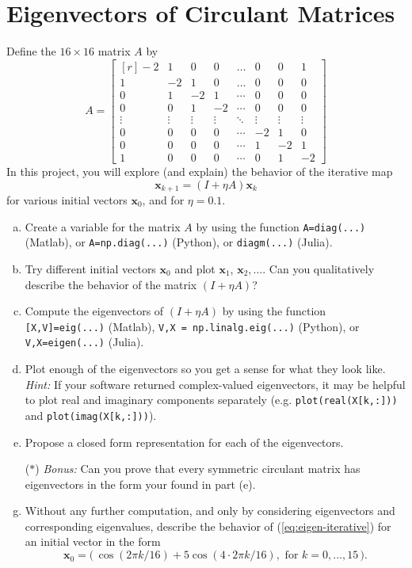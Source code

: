 \section{Eigenvectors of Circulant Matrices}


Define the $16 \times 16$ matrix $A$ by
\begin{equation}
A = \begin{bmatrix*}[r] -2 & 1 & 0 & 0 & \dots & 0 & 0 & 1 \\ 1 & -2 & 1 & 0 & \dots& 0 & 0 & 0 \\ 0 & 1 & -2 & 1 & \cdots&0 & 0 & 0 \\ 0 & 0 & 1 & -2 & \cdots&0 & 0 & 0 \\ \vdots & \vdots & \vdots & \vdots & \ddots & \vdots & \vdots & \vdots \\ 0 & 0 & 0 & 0 & \cdots & -2 & 1 & 0 \\ 0 & 0 & 0 & 0 & \cdots & 1 & -2 & 1\\ 1 & 0 & 0 & 0 & \cdots & 0 & 1 & -2 \end{bmatrix*}
\end{equation}
In this project, you will explore (and explain) the behavior of the iterative map
    \begin{equation}
      \label{eq:eigen-iterative}
      \bm{x}_{k+1} = \left(I + \eta A\right) \bm{x}_{k}
    \end{equation}
   for various initial vectors $\bm{x}_0$, and for $\eta = 0.1$. 
\begin{enumerate}[(a)]
  \item Create a variable for the matrix $A$ by using the function \texttt{A=diag(...)} (Matlab), or \texttt{A=np.diag(...)} (Python), or \texttt{diagm(...)} (Julia).
  \item Try different initial vectors $\bm{x}_0$ and plot $\bm{x}_1$, $\bm{x}_2, \dots $. Can you qualitatively describe the behavior of the matrix $(I + \eta A)$? 
  \item Compute the eigenvectors of $(I+\eta A)$ by using the function \texttt{[X,V]=eig(...)} (Matlab), \texttt{V,X = np.linalg.eig(...)} (Python), or \texttt{V,X=eigen(...)} (Julia).
  \item \sloppy Plot enough of the eigenvectors so you get a sense for what they look like.\\ \textit{Hint:} If your software returned complex-valued eigenvectors, it may be helpful to plot real and imaginary components separately (e.g. \texttt{plot(real(X[k,:]))} and \texttt{plot(imag(X[k,:]))}). 
  \item Propose a closed form representation for each of the eigenvectors.
  \item[($\ast$)] \textit{Bonus:} Can you prove that every symmetric circulant matrix has eigenvectors in the form your found in part (e).
  \item Without any further computation, and only by considering eigenvectors and corresponding eigenvalues, describe the behavior of (\ref{eq:eigen-iterative}) for an initial vector in the form
\begin{equation*}
\bm{x}_0 = \big(\, \cos(2\pi k / 16) + 5 \cos( 4 \cdot 2\pi k / 16), \text{ for } k = 0,...,15\,\big).
\end{equation*}
\end{enumerate}
